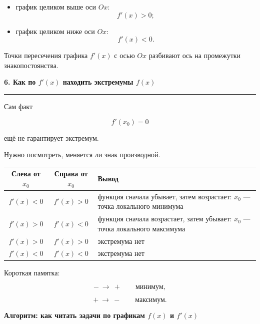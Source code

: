 \documentclass[a4paper,12pt]{article}
\newcommand{\maintitle}[1]{%
    {\Large\bfseries\color{darkaccent}#1\par}
    \vspace{2mm}
    {\color{accent}\rule{\linewidth}{0.6pt}}
    \vspace{4mm}
}
\begin{document}
\begin{itemize}
    \item график целиком выше оси \(Ox\):
    \[
    f'(x)>0;
    \]
    \item график целиком ниже оси \(Ox\):
    \[
    f'(x)<0.
    \]
\end{itemize}

Точки пересечения графика \(f'(x)\) с осью \(Ox\) разбивают ось
на промежутки знакопостоянства.

\maintitle{6. Как по \(f'(x)\) находить экстремумы \(f(x)\)}

Сам факт

\[
f'(x_0)=0
\]

ещё не гарантирует экстремум.

Нужно посмотреть, меняется ли знак производной.

\begin{center}
\begin{tabularx}{0.94\linewidth}{@{}c c X@{}}
\toprule
Слева от \(x_0\) & Справа от \(x_0\) & Вывод \\
\midrule
\(f'(x)<0\) & \(f'(x)>0\) &
функция сначала убывает, затем возрастает:
\(x_0\) --- точка локального минимума \\

\(f'(x)>0\) & \(f'(x)<0\) &
функция сначала возрастает, затем убывает:
\(x_0\) --- точка локального максимума \\

\(f'(x)>0\) & \(f'(x)>0\) &
экстремума нет \\

\(f'(x)<0\) & \(f'(x)<0\) &
экстремума нет \\
\bottomrule
\end{tabularx}
\end{center}

Короткая памятка:

\[
-\ \longrightarrow\ +
\qquad
\text{минимум},
\]

\[
+\ \longrightarrow\ -
\qquad
\text{максимум}.
\]

\clearpage
\thispagestyle{empty}

\begin{center}
{\Large\bfseries\color{darkaccent}
Алгоритм: как читать задачи по графикам \(f(x)\) и \(f'(x)\)
}
\end{center}
\end{document}
